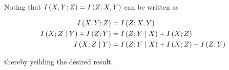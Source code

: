 \documentclass[ClusteringConnectionsMAIN.tex]{subfiles}
\begin{document}
	

  Noting that $I \left( X, Y; Z \right) = I \left( Z; X, Y \right)$ can be written as

\begin{align}
I \left( X, Y; Z \right) &= I \left( Z; X, Y \right) \notag \\
I \left( X; Z \mid Y \right) + I \left( Z; Y \right) &= I \left( Z; Y \mid X \right) + I \left( X; Z \right)   \notag \\
I \left( X; Z \mid Y \right) &= I \left( Z; Y \mid X \right) + I \left( X; Z \right) -  I \left( Z; Y \right) \notag 
\end{align}

thereby yeilding the desired result.
\end{document}

